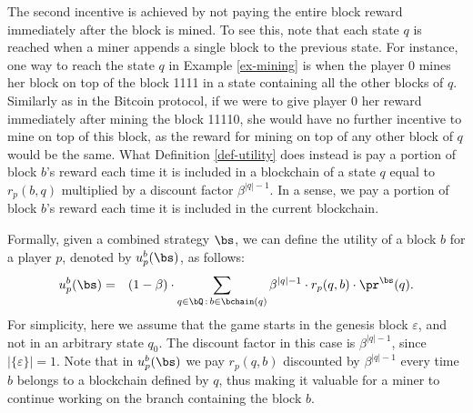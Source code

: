 The second incentive is achieved by not paying the entire block reward  immediately after the block is mined. To see this, note that each state $q$ is reached when a miner appends a single block to the previous state. For instance, one way to reach the state $q$ in Example \ref{ex-mining} is when the player 0 mines her block on top of the block 1111 in a state containing all the other blocks of $q$. Similarly as in the Bitcoin protocol, if we were to give player 0 her reward immediately after mining the block 11110, she would have no further incentive to mine on top of this block, as the reward for mining on top of any other block of $q$ would be the same. What Definition \ref{def-utility} does instead is pay a portion of block $b$'s reward each time it is included in a blockchain of a state $q$ equal to $r_p(b,q)$ multiplied by a discount factor $\beta^{|q|-1}$. In a sense, we pay a portion of block $b$'s reward each time it is included in the current blockchain.

Formally, given a combined strategy $\bs$, we can define the utility of a block $b$ for a player $p$, denoted by $u_p^b(\bs)$,  as follows:
\begin{eqnarray*}
u_p^b(\bs) & =  & (1 - \beta) \cdot  \sum_{q \in \bQ \,:\, b \in \bchain(q)} \beta^{|q|-1} \cdot  r_p(q,b) \cdot \pr^{\bs}(q).
\end{eqnarray*}
For simplicity, here we assume that the game starts in the genesis block $\varepsilon$, and not in an arbitrary state $q_0$. The discount factor in this case is $\beta^{|q|-1}$, since $|\{\varepsilon\}|= 1$.  Note that in $u_p^b(\bs)$ we pay $r_p(q,b)$ discounted by $\beta^{|q|-1}$ every time $b$ belongs to a blockchain defined by $q$, thus making it valuable for a miner to continue working on the branch containing the block $b$.

